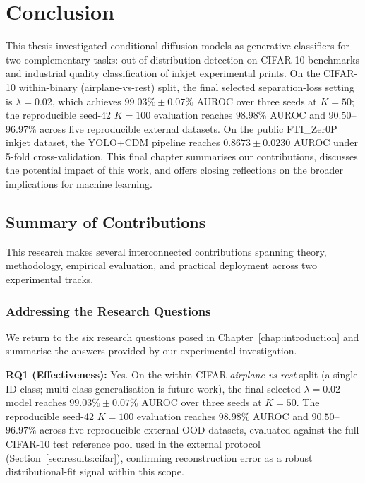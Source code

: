 \cleardoubleoddpage
\chapter{Conclusion}
\label{chap:conclusion}

This thesis investigated conditional diffusion models as generative classifiers for two complementary tasks: out-of-distribution detection on CIFAR-10 benchmarks and industrial quality classification of inkjet experimental prints. On the CIFAR-10 within-binary (airplane-vs-rest) split, the final selected separation-loss setting is $\lambda{=}0.02$, which achieves $99.03\% \pm 0.07\%$ AUROC over three seeds at $K{=}50$; the reproducible seed-42 $K{=}100$ evaluation reaches 98.98\% AUROC and 90.50--96.97\% across five reproducible external datasets. On the public FTI\_Zer0P inkjet dataset, the YOLO+CDM pipeline reaches $0.8673 \pm 0.0230$ AUROC under 5-fold cross-validation. This final chapter summarises our contributions, discusses the potential impact of this work, and offers closing reflections on the broader implications for machine learning.

\section{Summary of Contributions}
\label{sec:conc:summary}

This research makes several interconnected contributions spanning theory, methodology, empirical evaluation, and practical deployment across two experimental tracks.

\subsection{Addressing the Research Questions}
\label{sec:conc:summary:rq}

We return to the six research questions posed in Chapter~\ref{chap:introduction} and summarise the answers provided by our experimental investigation.

\noindent\textbf{RQ1 (Effectiveness):} Yes. On the within-CIFAR \emph{airplane-vs-rest} split (a single ID class; multi-class generalisation is future work), the final selected $\lambda{=}0.02$ model reaches $99.03\% \pm 0.07\%$ AUROC over three seeds at $K{=}50$. The reproducible seed-42 $K{=}100$ evaluation reaches $98.98\%$ AUROC and $90.50$--$96.97\%$ across five reproducible external OOD datasets, evaluated against the full CIFAR-10 test reference pool used in the external protocol (Section~\ref{sec:results:cifar}), confirming reconstruction error as a robust distributional-fit signal within this scope.

